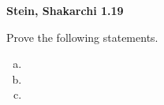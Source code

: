 \textbf{Stein, Shakarchi 1.19}

Prove the following statements.

\begin{enumerate}[(a)]
    \item 
    \item 
    \item 
\end{enumerate}